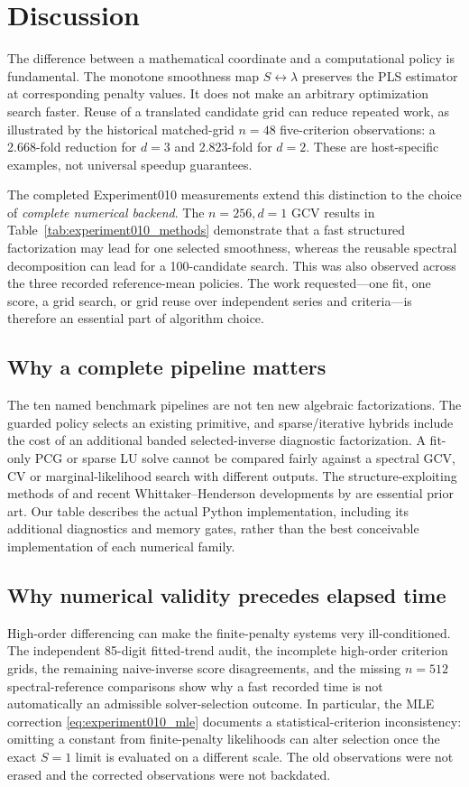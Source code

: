 \section{Discussion}\label{sec:discussion}
The difference between a mathematical coordinate and a computational
policy is fundamental. The monotone smoothness map $S\leftrightarrow\lambda$
preserves the PLS estimator at corresponding penalty values. It does
not make an arbitrary optimization search faster. Reuse of a translated
candidate grid can reduce repeated work, as illustrated by the
historical matched-grid $n=48$ five-criterion observations:
a 2.668-fold reduction for $d=3$ and 2.823-fold for $d=2$.
These are host-specific examples, not universal speedup guarantees.

The completed Experiment010 measurements extend this distinction to
the choice of \emph{complete numerical backend}. The $n=256,d=1$
GCV results in Table~\ref{tab:experiment010_methods} demonstrate
that a fast structured factorization may lead for one selected
smoothness, whereas the reusable spectral decomposition can lead
for a 100-candidate search. This was also observed across the three
recorded reference-mean policies. The work requested---one fit,
one score, a grid search, or grid reuse over independent series
and criteria---is therefore an essential part of algorithm choice.

\subsection{Why a complete pipeline matters}
The ten named benchmark pipelines are not ten new algebraic
factorizations. The guarded policy selects an existing primitive,
and sparse/iterative hybrids include the cost of an additional
banded selected-inverse diagnostic factorization. A fit-only
PCG or sparse LU solve cannot be compared fairly against
a spectral GCV, CV or marginal-likelihood search with
different outputs. The structure-exploiting
methods of \citet{weinert2007} and recent
Whittaker--Henderson developments by \citet{biessy2026}
are essential prior art. Our table describes the actual
Python implementation, including its additional
diagnostics and memory gates, rather than the
best conceivable implementation of each numerical family.

\subsection{Why numerical validity precedes elapsed time}
High-order differencing can make the finite-penalty systems
very ill-conditioned. The independent 85-digit fitted-trend
audit, the incomplete high-order criterion grids, the
remaining naive-inverse score disagreements, and the
missing $n=512$ spectral-reference comparisons show
why a fast recorded time is not automatically an
admissible solver-selection outcome. In particular,
the MLE correction \eqref{eq:experiment010_mle}
documents a statistical-criterion inconsistency:
omitting a constant from finite-penalty likelihoods
can alter selection once the exact $S=1$
limit is evaluated on a different scale.
The old observations were not erased and the
corrected observations were not backdated.

